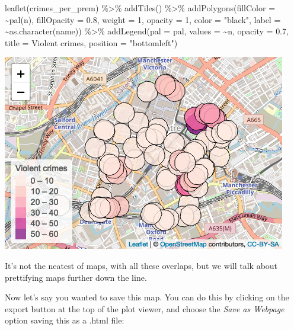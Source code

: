 \documentclass[
]{book}
\makeatletter
\newenvironment{Shaded}{\begin{snugshade}}{\end{snugshade}}
\newcommand{\AttributeTok}[1]{\textcolor[rgb]{0.61,0.61,0.61}{#1}}
\newcommand{\DecValTok}[1]{\textcolor[rgb]{0.06,0.06,0.06}{#1}}
\newcommand{\FloatTok}[1]{\textcolor[rgb]{0.06,0.06,0.06}{#1}}
\newcommand{\FunctionTok}[1]{\textcolor[rgb]{0,0,0}{#1}}
\newcommand{\NormalTok}[1]{#1}
\newcommand{\SpecialCharTok}[1]{\textcolor[rgb]{0,0,0}{#1}}
\newcommand{\StringTok}[1]{\textcolor[rgb]{0.5,0.5,0.5}{#1}}
\newenvironment{kframe}{%
\medskip{}
\setlength{\fboxsep}{.8em}
 \def\at@end@of@kframe{}%
 \ifinner\ifhmode%
  \def\at@end@of@kframe{\end{minipage}}%
  \begin{minipage}{\columnwidth}%
 \fi\fi%
 \def\FrameCommand##1{\hskip\@totalleftmargin \hskip-\fboxsep
 \colorbox{shadecolor}{##1}\hskip-\fboxsep
     \hskip-\linewidth \hskip-\@totalleftmargin \hskip\columnwidth}%
 \MakeFramed {\advance\hsize-\width
   \@totalleftmargin\z@ \linewidth\hsize
   \@setminipage}}%
 {\par\unskip\endMakeFramed%
 \at@end@of@kframe}
\renewenvironment{Shaded}{\begin{kframe}}{\end{kframe}}
\makeatother
\begin{document}
\begin{Shaded}
\begin{Highlighting}[]
\FunctionTok{leaflet}\NormalTok{(crimes\_per\_prem) }\SpecialCharTok{\%\textgreater{}\%} 
  \FunctionTok{addTiles}\NormalTok{() }\SpecialCharTok{\%\textgreater{}\%} 
  \FunctionTok{addPolygons}\NormalTok{(}\AttributeTok{fillColor =} \SpecialCharTok{\textasciitilde{}}\FunctionTok{pal}\NormalTok{(n), }\AttributeTok{fillOpacity =} \FloatTok{0.8}\NormalTok{,}
              \AttributeTok{weight =} \DecValTok{1}\NormalTok{, }\AttributeTok{opacity =} \DecValTok{1}\NormalTok{, }\AttributeTok{color =} \StringTok{"black"}\NormalTok{,}
              \AttributeTok{label =} \SpecialCharTok{\textasciitilde{}}\FunctionTok{as.character}\NormalTok{(name)) }\SpecialCharTok{\%\textgreater{}\%} 
  \FunctionTok{addLegend}\NormalTok{(}\AttributeTok{pal =}\NormalTok{ pal, }\AttributeTok{values =} \SpecialCharTok{\textasciitilde{}}\NormalTok{n, }\AttributeTok{opacity =} \FloatTok{0.7}\NormalTok{, }
            \AttributeTok{title =} \StringTok{\textquotesingle{}Violent crimes\textquotesingle{}}\NormalTok{, }\AttributeTok{position =} \StringTok{"bottomleft"}\NormalTok{) }
\end{Highlighting}
\end{Shaded}

\includegraphics{crime_mapping_files/figure-latex/unnamed-chunk-52-1.png}

It's not the neatest of maps, with all these overlaps, but we will talk about prettifying maps further down the line.

Now let's say you wanted to save this map. You can do this by clicking on the export button at the top of the plot viewer, and choose the \emph{Save as Webpage} option saving this as a .html file:
\end{document}
